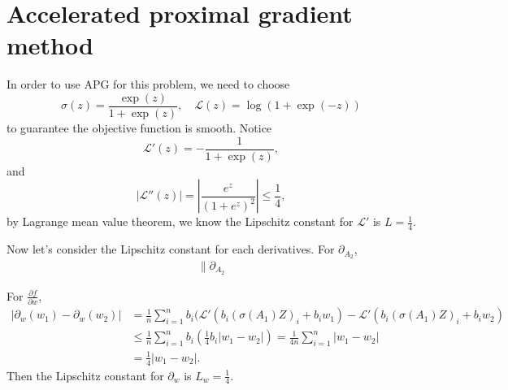 \documentclass{article}
\newcommand{\ml}{\mathcal{L}}
\numberwithin{equation}{section}
\numberwithin{figure}{section}
\begin{document}
\section{Accelerated proximal gradient method}

In order to use APG for this problem, we need to choose 
\begin{equation}
\sigma(z) = \frac{\exp(z)}{1+\exp(z)}, \quad \mathcal{L}(z) = \log(1+\exp(-z))
\end{equation}
to guarantee the objective function is smooth. Notice
\begin{equation}
\mathcal{L}'(z) = -\frac{1}{1+\exp(z)}, 
\end{equation}
and
\begin{equation}
|\ml''(z)| = \left|\frac{e^z}{(1+e^z)^2}\right| \le \frac{1}{4},
\end{equation}
by Lagrange mean value theorem, we know the Lipschitz constant for $\ml'$ is $L=\frac{1}{4}$.

Now let's consider the Lipschitz constant for each derivatives. For $\partial_{A_2} $,
\begin{equation}
\begin{aligned}
\lVert \partial_{A_2}
\end{aligned}
\end{equation}


For $\frac{\partial f}{\partial w}$,
\begin{equation}
\begin{aligned}
|\partial_w (w_1) - \partial_w (w_2)| &= \frac{1}{n}\sum_{i=1}^{n}b_i(\ml'(b_i(\sigma(A_1)Z)_i + b_i w_1) - \ml' (b_i(\sigma(A_1)Z)_i + b_i w_2) \\
&\le \frac{1}{n}\sum_{i=1}^{n}b_i(\frac{1}{4}b_i|w_1-w_2|) = \frac{1}{4n}\sum_{i=1}^{n}|w_1-w_2| \\
&= \frac{1}{4}|w_1-w_2|.
\end{aligned}
\end{equation}
Then the Lipschitz constant for $\partial_w $ is $L_w = \frac{1}{4} $.
\end{document}
